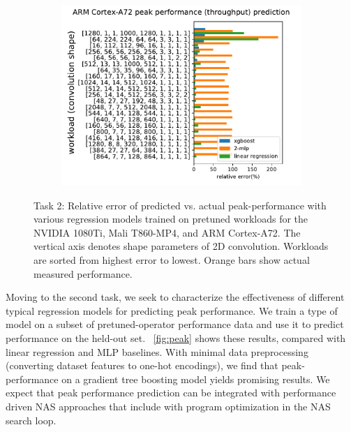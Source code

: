\begin{figure}[ht]
\begin{center}
\begin{subfigure}[]{\textwidth}
\label{fig:peakmali}
\end{subfigure}
\end{center}
\end{figure}
\begin{figure}[ht]
\ContinuedFloat
\begin{center}
\begin{subfigure}[]{\textwidth}
\includegraphics[width=\textwidth]{sys_figures/arm_cpu_rk3399_binary_throughput.pdf}
\label{fig:peaka72}
\end{subfigure}
\end{center}
\caption{Task 2: Relative error of predicted vs. actual peak-performance with various regression models trained on pretuned workloads for the NVIDIA 1080Ti, Mali T860-MP4, and ARM Cortex-A72.
The vertical axis denotes shape parameters of 2D convolution.
Workloads are sorted from highest error to lowest. Orange bars show actual measured performance.}
\label{fig:peak}
\end{figure}
Moving to the second task, we seek to characterize the effectiveness of different typical regression models for predicting peak performance. 
We train a type of model on a subset of pretuned-operator performance data and use it to predict performance on the held-out set.
~\autoref{fig:peak} shows these results, compared with linear regression and MLP baselines.
With minimal data preprocessing (converting dataset features to one-hot encodings), we find that peak-performance on a gradient tree boosting model yields promising results.
We expect that peak performance prediction can be integrated with performance driven NAS approaches that include with program optimization in the NAS search loop.

